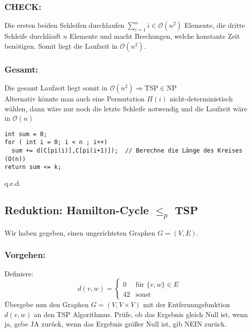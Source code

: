\documentclass[a4paper,11pt,twoside]{article}
\begin{document}
\subsubsection*{CHECK:}
Die ersten beiden Schleifen durchlaufen $\sum_{i=1}^{n} i \in \mathcal{O}(n^2)$ Elemente, die dritte Schleife durchläuft $n$ Elemente und macht Brechungen, welche konstante Zeit benötigen. Somit liegt die Laufzeit in $\mathcal{O}(n^2)$.

\subsubsection*{Gesamt:}
Die gesamt Laufzeit liegt somit in $\mathcal{O}(n^2) \Rightarrow \text{TSP}\in \text{NP}$\\
Alternativ könnte man auch eine Permutation $\Pi(i)$ nicht-deterministisch wählen, dann wäre nur noch die letzte Schleife notwendig und die Laufzeit wäre in $\mathcal{O}(n)$
\begin{lstlisting}
int sum = 0;
for ( int i = 0; i < n ; i++)
  sum += d(C[pi(i)],C[pi(i+1)]);  // Berechne die Länge des Kreises (O(n))
return sum <= k;
\end{lstlisting}
 \begin{flushright}
	q.e.d.
\end{flushright}


\subsection*{Reduktion: Hamilton-Cycle $\leq_p $ TSP}
Wir haben gegeben, einen ungerichteten Graphen $G=(V,E)$.
\subsubsection*{Vorgehen:}
Definiere:
\[ d(v,w)=\begin{cases}0&\text{für }\{v,w\}\in E\\42&\text{sonst}\end{cases} \]
Übergebe nun den Graphen $G=(V, V\times V)$ mit der Entfernungsfunktion $d(v,w)$ an den TSP Algorithmus. Prüfe, ob das Ergebnis gleich Null ist, wenn ja, gebe JA zurück, wenn das Ergebnis größer Null ist, gib NEIN zurück.
\end{document}
